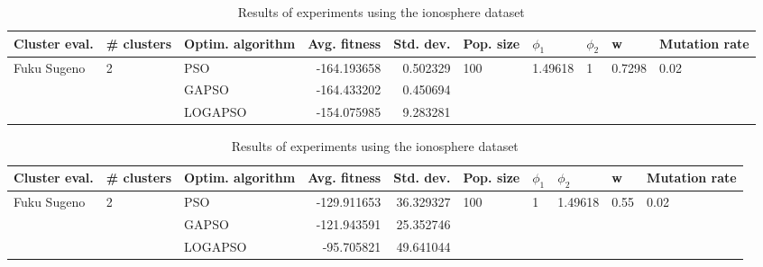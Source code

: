 \documentclass{article}
\begin{document}
\begin{table}
\centering
\caption{Results of experiments using the ionosphere dataset}
\begin{tabular}{lllrrlllll}
\toprule
               Cluster eval. &        \# clusters & Optim. algorithm &  Avg. fitness &  Std. dev. &            Pop. size &               $\phi_{1}$ &         $\phi_{2}$ &                       w &         Mutation rate \\
\midrule
\multirow{3}{*}{Fuku Sugeno} & \multirow{3}{*}{2} &              PSO &   -164.193658 &   0.502329 & \multirow{3}{*}{100} & \multirow{3}{*}{1.49618} & \multirow{3}{*}{1} & \multirow{3}{*}{0.7298} & \multirow{3}{*}{0.02} \\
                             &                    &            GAPSO &   -164.433202 &   0.450694 &                      &                          &                    &                         &                       \\
                             &                    &          LOGAPSO &   -154.075985 &   9.283281 &                      &                          &                    &                         &                       \\
\bottomrule
\end{tabular}
\end{table}
\begin{table}
\centering
\caption{Results of experiments using the ionosphere dataset}
\begin{tabular}{lllrrlllll}
\toprule
               Cluster eval. &        \# clusters & Optim. algorithm &  Avg. fitness &  Std. dev. &            Pop. size &         $\phi_{1}$ &               $\phi_{2}$ &                     w &         Mutation rate \\
\midrule
\multirow{3}{*}{Fuku Sugeno} & \multirow{3}{*}{2} &              PSO &   -129.911653 &  36.329327 & \multirow{3}{*}{100} & \multirow{3}{*}{1} & \multirow{3}{*}{1.49618} & \multirow{3}{*}{0.55} & \multirow{3}{*}{0.02} \\
                             &                    &            GAPSO &   -121.943591 &  25.352746 &                      &                    &                          &                       &                       \\
                             &                    &          LOGAPSO &    -95.705821 &  49.641044 &                      &                    &                          &                       &                       \\
\bottomrule
\end{tabular}
\end{table}
\end{document}
